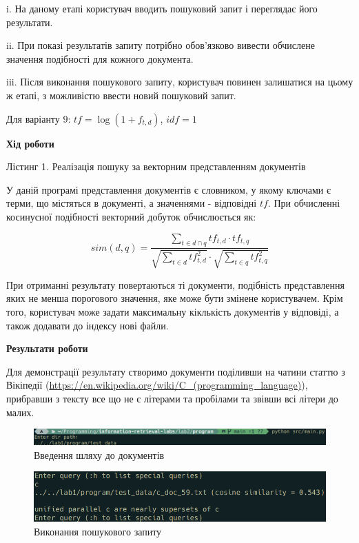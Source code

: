 \documentclass{../../templates/information_retrieval_lab}
\begin{document}
i. На даному етапі користувач вводить пошуковий запит і
переглядає його результати.

ii. При показі результатів запиту потрібно обов’язково вивести
обчислене значення подібності для кожного документа.

iii. Після виконання пошукового запиту, користувач повинен
залишатися на цьому ж етапі, з можливістю ввести новий
пошуковий запит.

Для варіанту $9$: $tf=\log(1+f_{t,d})$, $idf=1$

\centerline{\textbf{Хід роботи}}

Лістинг 1. Реалізація пошуку за векторним представленням документів



У даній програмі представлення документів є словником, у якому ключами є терми, що містяться в документі, а значеннями - відповідні $tf$. При обчисленні косинусної подібності векторний добуток обчислюється як:

\begin{equation*}
sim(d,q)=\frac{\sum\limits_{t\in d\cap q}tf_{t,d}\cdot tf_{t,q}}{\sqrt{\sum\limits_{t\in d}tf_{t,d}^2}\cdot\sqrt{\sum\limits_{t\in q}tf_{t,q}^2}}
\end{equation*}

При отриманні результату повертаються ті документи, подібність представлення яких не менша порогового значення, яке може бути змінене користувачем. Крім того, користувач може задати максимальну кіклькість документів у відповіді, а також додавати до індексу нові файли.

\centerline{\textbf{Результати роботи}}

Для демонстрації результату створимо документи поділивши на чатини статтю з Вікіпедії (\url{https://en.wikipedia.org/wiki/C_(programming_language)}), прибравши з тексту все що не є літерами та пробілами та звівши всі літери до малих.

\begin{figure}[H]
    \centering
    \includegraphics[width=\textwidth]{img/screen0.png}
    \caption{Введення шляху до документів}
\end{figure}

\begin{figure}[H]
    \centering
    \includegraphics[width=\textwidth]{img/screen1.png}
    \caption{Виконання пошукового запиту}
\end{figure}
\end{document}
